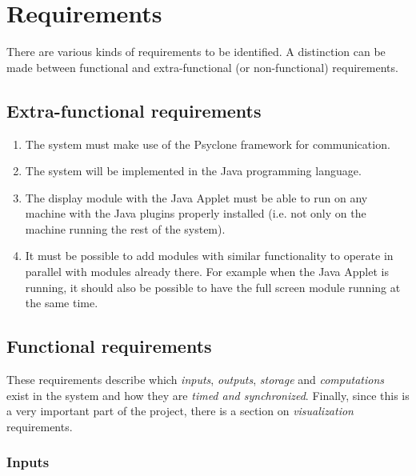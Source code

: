 \chapter{\label{cpt:requirements}Requirements}

There are various kinds of requirements to be identified. A distinction can be
made between functional and extra-functional (or non-functional) requirements.

\section{Extra-functional requirements}

\begin{enumerate}
  \item The system must make use of the Psyclone framework for communication.
  \item The system will be implemented in the Java programming language.
  \item The display module with the Java Applet must be able to run on any
        machine with the Java plugins properly installed (i.e. not only on the
        machine running the rest of the system).
  \item It must be possible to add modules with similar functionality to
        operate in parallel with modules already there. For example when the
        Java Applet is running, it should also be possible to have the full
        screen module running at the same time. 
\end{enumerate}

\section{Functional requirements}

These requirements describe which \emph{inputs}, \emph{outputs}, \emph{storage}
and \emph{computations} exist in the system and how they are \emph{timed and
synchronized}. Finally, since this is a very important part of the project,
there is a section on \emph{visualization} requirements.

\subsection{Inputs}


